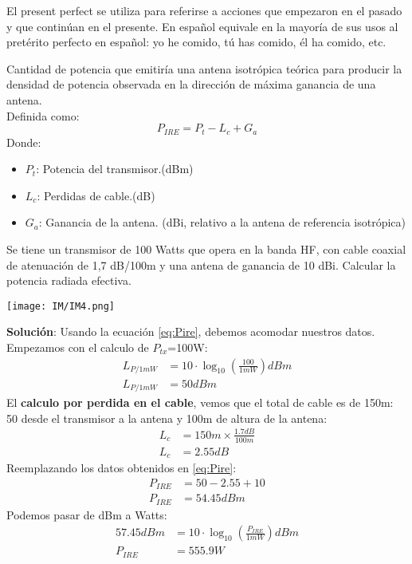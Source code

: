\documentclass[
	12pt, %
	fleqn, %
	a4paper, %
	oneside, %
]{LegrandOrangeBook}
\begin{document}
El present perfect se utiliza para referirse a acciones que empezaron en el pasado y que continúan en el presente. En español equivale en la mayoría de sus usos al pretérito perfecto en español: yo he comido, tú has comido, él ha comido, etc.
\begin{definition}
Cantidad de potencia que emitiría una antena isotrópica teórica para producir la densidad de potencia observada en la dirección de máxima ganancia de una antena.\\
Definida como:
\begin{equation}
\label{eq:Pire}
P_{IRE}=P_t-L_c+G_a
\end{equation}
Donde:
\begin{itemize}
\item $P_t$: Potencia del transmisor.(dBm)
\item $L_c$: Perdidas de cable.(dB)
\item $G_a$: Ganancia de la antena. (dBi, relativo a la antena de referencia isotrópica)
\end{itemize}
\end{definition}
\begin{example}
Se tiene un transmisor de 100 Watts que opera en la banda HF, con cable coaxial de atenuación de 1,7 dB/100m y una antena de ganancia de 10 dBi. Calcular la potencia radiada efectiva.\\
\begin{center}
\texttt{[image: IM/IM4.png]}
\end{center}
\textbf{Solución}:
Usando la ecuación \ref{eq:Pire}, debemos acomodar nuestros datos. Empezamos con el calculo de $P_{tx}$=100W:
\begin{align*}
L_{P/1mW}&=10\cdot \log_{10}\left(\frac{100}{1mW}\right)dBm\\
L_{P/1mW}&=50dBm
\end{align*}
El \textbf{calculo por perdida en el cable}, vemos que el total de cable es de 150m: 50 desde el transmisor a la antena y 100m de altura de la antena:
\begin{align*}
L_c&=150m\times\frac{1.7dB}{100m}\\
L_c&=2.55dB
\end{align*}
Reemplazando los datos obtenidos en \ref{eq:Pire}:
\begin{align*}
P_{IRE}&=50-2.55+10\\
P_{IRE}&=54.45 dBm
\end{align*}
Podemos pasar de dBm a Watts:
\begin{align*}
57.45dBm&=10\cdot \log_{10}\left(\frac{P_{IRE}}{1mW}\right)dBm\\
P_{IRE}&=555.9 W
\end{align*}
\end{example}
\end{document}
